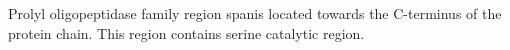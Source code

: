 Prolyl oligopeptidase family region spanis located towards the C-terminus of the protein chain. This region contains serine catalytic region.  